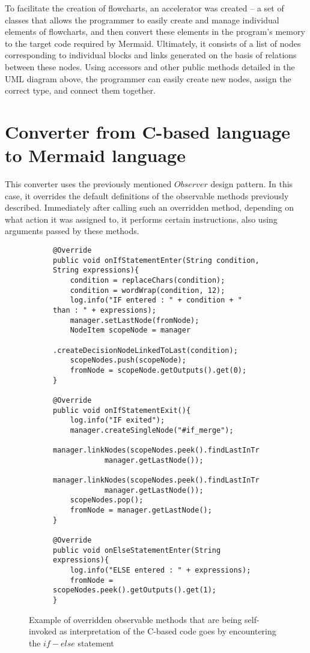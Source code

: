 To facilitate the creation of flowcharts, an accelerator was created -- a set of classes that allows the programmer to easily create and manage individual elements of flowcharts, and then convert these elements in the program's memory to the target code required by Mermaid. Ultimately, it consists of a list of nodes corresponding to individual blocks and links generated on the basis of relations between these nodes. Using accessors and other public methods detailed in the UML diagram above, the programmer can easily create new nodes, assign the correct type, and connect them together.

\section{Converter from C-based language to Mermaid language}

This converter uses the previously mentioned $Observer$ design pattern. In this case, it overrides the default definitions of the observable methods previously described. Immediately after calling such an overridden method, depending on what action it was assigned to, it performs certain instructions, also using arguments passed by these methods.
	
							
\begin{figure}[H]
  \begin{subfigure}{\textwidth}
		\begin{verbatim}
@Override
public void onIfStatementEnter(String condition, String expressions){
    condition = replaceChars(condition);
    condition = wordWrap(condition, 12);
    log.info("IF entered : " + condition + " than : " + expressions);
    manager.setLastNode(fromNode);
    NodeItem scopeNode = manager
            .createDecisionNodeLinkedToLast(condition);
    scopeNodes.push(scopeNode);
    fromNode = scopeNode.getOutputs().get(0);
}

@Override
public void onIfStatementExit(){
    log.info("IF exited");
    manager.createSingleNode("#if_merge");
    manager.linkNodes(scopeNodes.peek().findLastInTree(0), 
            manager.getLastNode());
    manager.linkNodes(scopeNodes.peek().findLastInTree(1), 
            manager.getLastNode());
    scopeNodes.pop();
    fromNode = manager.getLastNode();
}

@Override
public void onElseStatementEnter(String expressions){
    log.info("ELSE entered : " + expressions);
    fromNode = scopeNodes.peek().getOutputs().get(1);
}
		\end{verbatim}
  \end{subfigure}\hfill
  \caption{Example of overridden observable methods that are being self-invoked as interpretation of the C-based code goes by encountering the $if-else$ statement}
\end{figure}


